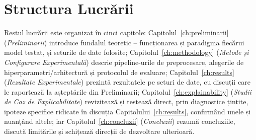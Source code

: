 \section{Structura Lucrării}

Restul lucrării este organizat în cinci capitole: 
Capitolul~\ref{ch:preliminarii} (\emph{Preliminarii}) introduce fundalul teoretic -- funcționarea și paradigma fiecărui model testat, și seturile de date folosite; 
Capitolul~\ref{ch:methodology} (\emph{Metode și Configurare Experimentală}) descrie pipeline-urile de preprocesare, alegerile de hiperparametri/arhitectură și protocolul de evaluare; 
Capitolul~\ref{ch:results} (\emph{Rezultate Experimentale}) prezintă rezultatele pe seturi de date, cu discuții care le raportează la așteptările din Preliminarii; 
Capitolul~\ref{ch:explainability} (\emph{Studii de Caz de Explicabilitate}) revizitează și testează direct, prin diagnostice țintite, ipoteze specifice ridicate în discuția Capitolului~\ref{ch:results}, confirmând unele și nuanțând altele; 
iar Capitolul~\ref{ch:concluzii} (\emph{Concluzii}) rezumă concluziile, discută limitările și schițează direcții de dezvoltare ulterioară.